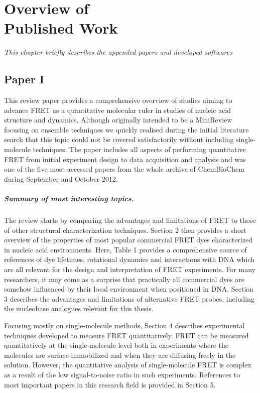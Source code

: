\chapter{Overview of\\Published Work}
\label{chap:PaperOverview}
\textit{This chapter briefly describes the appended papers and developed softwares}
\vfill
\minitoc
\newpage

\section{Paper I}
 This review paper provides a comprehensive overview of studies aiming to advance FRET as a quantitative molecular ruler in studies of nucleic acid structure and dynamics. Although originally intended to be a MiniReview focusing on ensemble techniques we quickly realised during the initial literature search that this topic could not be covered satisfactorily without including single-molecule techniques. The paper includes all aspects of performing quantitative FRET from initial experiment design to data acquisition and analysis and was one of the five most accessed papers from the whole archive of ChemBioChem during September and October 2012.

 \paragraph{Summary of most interesting topics.} The review starts by comparing the advantages and limitations of FRET to those of other structural characterization techniques. Section 2 then provides a short overview of the properties of most popular commercial FRET dyes characterized in nucleic acid environments. Here, Table 1 provides a comprehensive source of references of dye lifetimes, rotational dynamics and interactions with DNA which are all relevant for the design and interpretation of FRET experiments. For many researchers, it may come as a surprise that practically all commercial dyes are somehow influenced by their local environment when positioned in DNA. Section 3 describes the advantages and limitations of alternative FRET probes, including the nucleobase analogues relevant for this thesis.

 Focusing mostly on single-molecule methods, Section 4 describes experimental techniques developed to measure FRET quantitatively. FRET can be measured quantitatively at the single-molecule level both in experiments where the molecules are surface-immobilized and when they are diffusing freely in the solution. However, the quantitative analysis of single-molecule FRET is complex as a result of the low signal-to-noise ratio in such experiments. References to most important papers in this research field is provided in Section 5.

